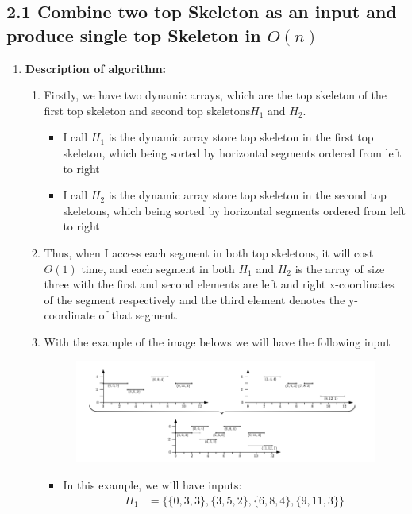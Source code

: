 \documentclass{article}
\begin{document}
	\subsection*{2.1 Combine two top Skeleton as an input and produce single top Skeleton in \(O(n)\)}
	\begin{enumerate}[label=({\alph*})]
		\item \textbf{Description of algorithm:}
		\begin{enumerate}
			\item Firstly, we have two dynamic arrays, which are the top skeleton of the first top skeleton and second top skeletons\(H_1\) and \(H_2\). 
			\begin{itemize}
				\item I call \textbf{\(H_1\)} is the dynamic array store top skeleton in the first top skeleton, which being sorted by horizontal segments ordered from left to right
				\item I call \textbf{\(H_2\)} is the dynamic array store top skeleton in the second top skeletons, which being sorted by horizontal segments ordered from left to right
			\end{itemize}
			\item Thus, when I access each segment in both top skeletons, it will cost \(\Theta(1)\) time, and each segment in both \textbf{\(H_1\)} and \textbf{\(H_2\)} is the array of size three with the first and second elements are left and right x-coordinates of the segment respectively and the third element denotes the y-coordinate of that segment.
			\item With the example of the image belows we will have the following input
			\begin{figure}[h]
				\includegraphics[width=16cm]{example2.png}
			\end{figure}
			\begin{itemize}
				\item In this example, we will have inputs:
				\begin{align}
					H_1 &= \{\{0, 3, 3\}, \{3, 5, 2\}, \{6, 8, 4\}, \{9, 11, 3\}\} \\

\end{align}
\end{itemize}
\end{enumerate}
\end{enumerate}
\end{document}
